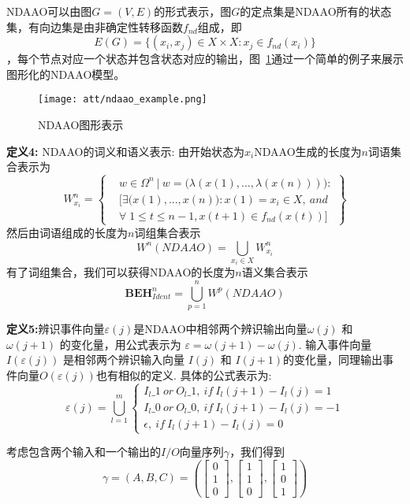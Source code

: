 NDAAO可以由图$G=(V,E)$的形式表示，图$G$的定点集是NDAAO所有的状态集，有向边集是由非确定性转移函数$f_{nd}$组成，即\[ E(G)=\big\{(x_i,x_j)\in X\times X: x_j\in f_{nd}(x_i)\big\} \]，每个节点对应一个状态并包含状态对应的输出，图~\ref{fig4}通过一个简单的例子来展示图形化的NDAAO模型。

\begin{figure}[!htb]
  \centering
  \texttt{[image: att/ndaao\_example.png]}
  \caption{NDAAO图形表示}
  \label{fig4}
\end{figure}

\textbf{定义4:} NDAAO的词义和语义表示: 由开始状态为$x_i$NDAAO生成的长度为$n$词语集合表示为
\begin{equation} 
W_{x_i}^{n}=\left\{\begin{split} &w\in \Omega^n~|~ w=\big( \lambda(x(1),...,\lambda(x(n))) \big):\\ 
&[\exists \big(x(1),...,x(n)\big): x(1)=x_i\in X,~and\\
&\forall\;1\leq t\leq n-1, x(t+1)\in f_{nd}(x(t))] \end{split} \right\} 
\end{equation} 然后由词语组成的长度为$n$词组集合表示
\begin{equation} 
W^n(NDAAO)=\bigcup_{x_i\in X} W_{x_i}^{n} 
\end{equation} 有了词组集合，我们可以获得NDAAO的长度为$n$语义集合表示
\begin{equation} 
\textbf{BEH}_{Ident}^n=\bigcup_{p=1}^n W^{p}(NDAAO) 
\end{equation}

\textbf{定义5:}辨识事件向量$\varepsilon(j)$是NDAAO中相邻两个辨识输出向量$\omega(j)$ 和 $\omega(j+1)$ 的变化量，用公式表示为 $\varepsilon=\omega(j+1)-\omega(j)$. 输入事件向量 $I(\varepsilon(j))$ 是相邻两个辨识输入向量 $I(j)$ 和 $I(j+1)$的变化量，同理输出事件向量$O(\varepsilon(j))$也有相似的定义. 具体的公式表示为:
\begin{equation} 
\varepsilon(j)=\bigcup_{l=1}^m \begin{cases}
I_l\_1~or~O_l\_1,~if~ I_l(j+1)-I_l(j)=1\\
I_l\_0~or~O_l\_0,~if~ I_l(j+1)-I_l(j)=-1\\
\epsilon,~if~ I_l(j+1)-I_l(j)=0
\end{cases} 
\end{equation}

考虑包含两个输入和一个输出的$I/O$向量序列$\gamma$，我们得到 \[\gamma=(A,B,C)=( \begin{bmatrix}
0\\1\\0
\end{bmatrix},\begin{bmatrix}
1\\1\\0
\end{bmatrix},\begin{bmatrix}
1\\0\\1
\end{bmatrix})\]

